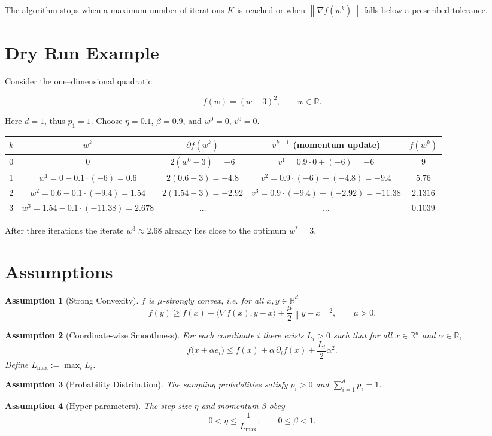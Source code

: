 \documentclass[11pt]{article}
\newtheorem{assumption}{Assumption}
\newcommand{\R}{\mathbb{R}}
\newcommand{\norm}[1]{\left\|#1\right\|}
\newcommand{\ip}[2]{\langle #1,#2\rangle}
\newcommand{\grad}{\nabla}
\begin{document}
The algorithm stops when a maximum number of iterations $K$ is reached or when $\norm{\grad f(w^{k})}$ falls below a prescribed tolerance.

\section*{Dry Run Example}
Consider the one–dimensional quadratic  

\[
f(w)=(w-3)^{2},\qquad w\in\R .
\]

Here $d=1$, thus $p_{1}=1$.  Choose $\eta=0.1$, $\beta=0.9$, and $w^{0}=0$, $v^{0}=0$.

\begin{center}
\begin{tabular}{c|c|c|c|c}
$k$ & $w^{k}$ & $\partial f(w^{k})$ & $v^{k+1}$ (momentum update) & $f(w^{k})$\\ \hline
0 & $0$   & $2(w^{0}-3)=-6$ & $v^{1}=0.9\cdot0+(-6)=-6$ & $9$\\
1 & $w^{1}=0-0.1\cdot(-6)=0.6$ & $2(0.6-3)=-4.8$ & $v^{2}=0.9\cdot(-6)+(-4.8)=-9.4$ & $5.76$\\
2 & $w^{2}=0.6-0.1\cdot(-9.4)=1.54$ & $2(1.54-3)=-2.92$ & $v^{3}=0.9\cdot(-9.4)+(-2.92)=-11.38$ & $2.1316$\\
3 & $w^{3}=1.54-0.1\cdot(-11.38)=2.678$ & $\dots$ & $\dots$ & $0.1039$
\end{tabular}
\end{center}

After three iterations the iterate $w^{3}\approx2.68$ already lies close to the optimum $w^{*}=3$.

\section*{Assumptions}
\begin{assumption}[Strong Convexity]\label{as:strong}
$f$ is $\mu$‑strongly convex, i.e. for all $x,y\in\R^{d}$
\[
f(y)\ge f(x)+\ip{\grad f(x)}{y-x}+\frac{\mu}{2}\norm{y-x}^{2},
\qquad \mu>0 .
\]
\end{assumption}
\begin{assumption}[Coordinate‑wise Smoothness]\label{as:smooth}
For each coordinate $i$ there exists $L_i>0$ such that for all $x\in\R^{d}$ and $\alpha\in\R$,
\[
f\bigl(x+ \alpha e_i\bigr)\le f(x)+\alpha\,\partial_i f(x)+\frac{L_i}{2}\alpha^{2}.
\]
Define $L_{\max}:=\max_i L_i$.
\end{assumption}
\begin{assumption}[Probability Distribution]\label{as:prob}
The sampling probabilities satisfy $p_i>0$ and $\sum_{i=1}^{d}p_i=1$.
\end{assumption}
\begin{assumption}[Hyper‑parameters]\label{as:hyper}
The step size $\eta$ and momentum $\beta$ obey
\[
0<\eta\le \frac{1}{L_{\max}},\qquad 0\le\beta<1 .
\]
\end{assumption}
\end{document}
